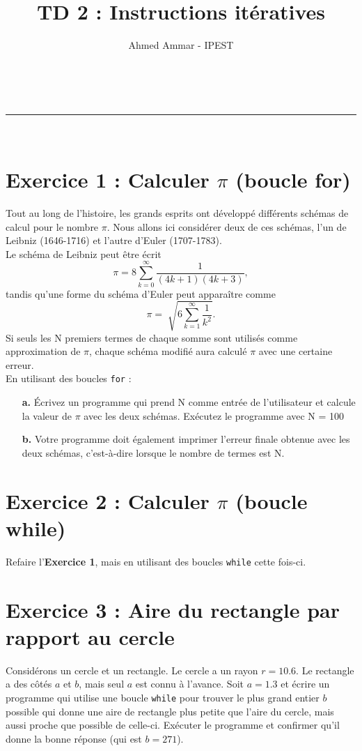 \documentclass[a4paper,11pt]{article}
\author{Ahmed Ammar - IPEST}
\makeatletter
\newcommand{\linia}{\rule{\linewidth}{0.5pt}}
\theoremstyle{mytheor}
\renewcommand{\maketitle}{
\begin{center}
\vspace{2ex}
{\huge \textsc{\@title}}
\vspace{1ex}
\\
\linia\\
\@author \hfill \@date
\vspace{4ex}
\end{center}
}
\makeatother
\begin{document}
\title{TD 2 : Instructions itératives}

\maketitle


\section*{Exercice 1 : Calculer $\pi$ (boucle for)}
Tout au long de l'histoire, les grands esprits ont développé différents schémas de calcul pour le nombre $\pi$. Nous allons ici considérer deux de ces schémas, l'un de Leibniz (1646-1716) et l'autre d'Euler (1707-1783).\\
Le schéma de Leibniz peut être écrit
\begin{equation*}
\pi = 8\sum_{k=0}^{\infty}\frac{1}{(4k + 1)(4k + 3)} ,
\end{equation*}
tandis qu'une forme du schéma d'Euler peut apparaître comme
\begin{equation*}
\pi = \sqrt[]{6\sum_{k=1}^{\infty}\frac{1}{k^2}} .
\end{equation*}
Si seuls les N premiers termes de chaque somme sont utilisés comme approximation de $\pi$, chaque schéma modifié aura calculé $\pi$ avec une certaine erreur.\\
En utilisant des boucles \lstinline|for| :
\begin{itemize}
	\item[\textbf{a.}] Écrivez un programme qui prend N comme entrée de l'utilisateur et calcule la valeur de $\pi$ avec les deux schémas. Exécutez le programme avec N = 100
	\item[\textbf{b.}] Votre programme doit également imprimer l'erreur finale obtenue avec les deux schémas, c'est-à-dire lorsque le nombre de termes est N.
\end{itemize}
\section*{Exercice 2 : Calculer $\pi$ (boucle while)}
Refaire l'\textbf{Exercice 1}, mais en utilisant des boucles \lstinline|while| cette fois-ci.
\section*{Exercice 3 : Aire du rectangle par rapport au cercle}
Considérons un cercle et un rectangle. Le cercle a un rayon $r = 10.6$. Le rectangle a des côtés $a$ et $b$, mais seul $a$ est connu à l'avance. Soit $a = 1.3$ et écrire un programme qui utilise une boucle \lstinline|while| pour trouver le plus grand entier $b$ possible qui donne une aire de rectangle plus petite que l'aire du cercle, mais aussi proche que possible de celle-ci. Exécuter le programme et confirmer qu'il donne la bonne réponse (qui est $b = 271$).
\end{document}
